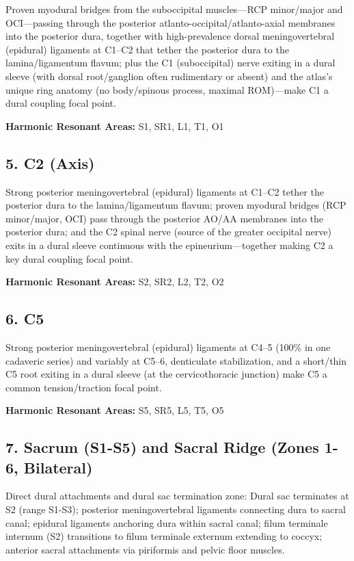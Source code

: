 \documentclass[11pt,letterpaper]{article}
\begin{document}
Proven myodural bridges from the suboccipital muscles—RCP minor/major and OCI—passing through the posterior atlanto-occipital/atlanto-axial membranes into the posterior dura, together with high-prevalence dorsal meningovertebral (epidural) ligaments at C1–C2 that tether the posterior dura to the lamina/ligamentum flavum; plus the C1 (suboccipital) nerve exiting in a dural sleeve (with dorsal root/ganglion often rudimentary or absent) and the atlas's unique ring anatomy (no body/spinous process, maximal ROM)—make C1 a dural coupling focal point.


\textbf{Harmonic Resonant Areas:} S1, SR1, L1, T1, O1


\subsection{5. C2 (Axis)}

Strong posterior meningovertebral (epidural) ligaments at C1–C2 tether the posterior dura to the lamina/ligamentum flavum; proven myodural bridges (RCP minor/major, OCI) pass through the posterior AO/AA membranes into the posterior dura; and the C2 spinal nerve (source of the greater occipital nerve) exits in a dural sleeve continuous with the epineurium—together making C2 a key dural coupling focal point.


\textbf{Harmonic Resonant Areas:} S2, SR2, L2, T2, O2


\subsection{6. C5}

Strong posterior meningovertebral (epidural) ligaments at C4–5 (100\% in one cadaveric series) and variably at C5–6, denticulate stabilization, and a short/thin C5 root exiting in a dural sleeve (at the cervicothoracic junction) make C5 a common tension/traction focal point.


\textbf{Harmonic Resonant Areas:} S5, SR5, L5, T5, O5


\subsection{7. Sacrum (S1-S5) and Sacral Ridge (Zones 1-6, Bilateral)}

Direct dural attachments and dural sac termination zone: Dural sac terminates at S2 (range S1-S3); posterior meningovertebral ligaments connecting dura to sacral canal; epidural ligaments anchoring dura within sacral canal; filum terminale internum (S2) transitions to filum terminale externum extending to coccyx; anterior sacral attachments via piriformis and pelvic floor muscles.
\end{document}
